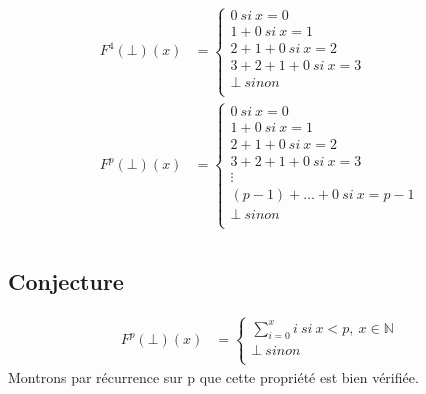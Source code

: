 \documentclass[11pt,a4paper]{article}
\newcommand{\bb}[1]{\mathbb{#1}}
\begin{document}
	\begin{align*}
	F^4(\bot)(x) &=	\begin{cases}
						0\ si\ x = 0\\
						1 + 0\ si\ x = 1\\
						2 + 1 + 0\ si\ x = 2\\
						3 + 2 + 1 + 0\ si\ x = 3\\
						\bot\ sinon\\
					\end{cases}\\
	F^p(\bot)(x) &=	\begin{cases}
						0\ si\ x = 0\\
						1 + 0\ si\ x = 1\\
						2 + 1 + 0\ si\ x = 2\\
						3 + 2 + 1 + 0\ si\ x = 3\\
						\vdots\\
						(p - 1) + \ldots + 0\ si\ x = p - 1\\
						\bot\ sinon\\
					\end{cases}\\
	\end{align*}
	
	\subsection{Conjecture}
	
	\begin{align*}
		F^p(\bot)(x) &= \begin{cases}
							\sum_{i=0}^{x}i\ si\ x < p,\ x \in \bb{N}\\
							\bot\ sinon\\
						\end{cases}
	\end{align*}
	Montrons par récurrence sur p que cette propriété est bien vérifiée.
	
\end{document}
